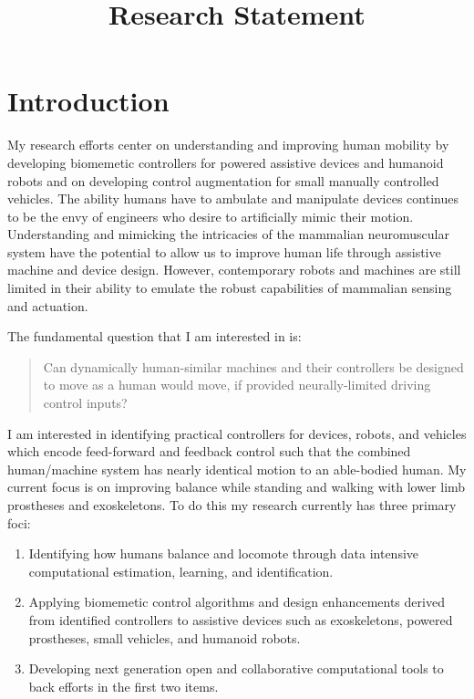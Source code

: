 \documentclass[letter,titlepage]{article}
\title{\phantomsection%
  Research Statement%
  \label{research-statement}}
\author{}
\date{}
\begin{document}
\maketitle


\section{Introduction%
  \label{introduction}%
}

My research efforts center on understanding and improving human mobility by
developing biomemetic controllers for powered assistive devices and humanoid
robots and on developing control augmentation for small manually controlled
vehicles. The ability humans have to ambulate and manipulate devices continues
to be the envy of engineers who desire to artificially mimic their motion.
Understanding and mimicking the intricacies of the mammalian neuromuscular
system have the potential to allow us to improve human life through assistive
machine and device design. However, contemporary robots and machines are still
limited in their ability to emulate the robust capabilities of mammalian
sensing and actuation.

The fundamental question that I am interested in is:

\begin{quote}
Can dynamically human-similar machines and their controllers be designed to
move as a human would move, if provided neurally-limited driving control
inputs?
\end{quote}

I am interested in identifying practical controllers for devices, robots, and
vehicles which encode feed-forward and feedback control such that the combined
human/machine system has nearly identical motion to an able-bodied human. My
current focus is on improving balance while standing and walking with lower
limb prostheses and exoskeletons. To do this my research currently has three
primary foci:

\begin{enumerate}
\item Identifying how humans balance and locomote through data intensive
computational estimation, learning, and identification.

\item Applying biomemetic control algorithms and design enhancements derived from
identified controllers to assistive devices such as exoskeletons, powered
prostheses, small vehicles, and humanoid robots.

\item Developing next generation open and collaborative computational tools to
back efforts in the first two items.
\end{enumerate}
\end{document}
